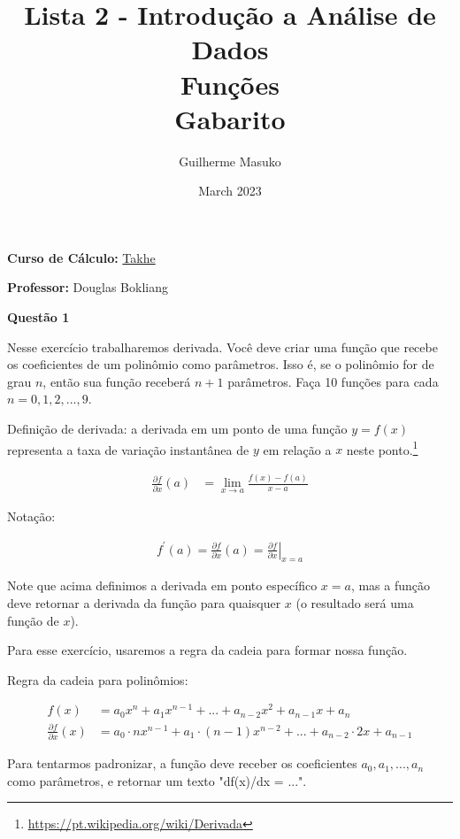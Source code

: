 \documentclass[12pt, a4paper]{article}
\title{Lista 2 - Introdução a Análise de Dados \\
Funções \\
Gabarito}
\author{Guilherme Masuko}
\date{March 2023}
\begin{document}
	
\clearpage
\maketitle
\thispagestyle{empty}


\textbf{Curso de Cálculo:} \href{https://cursos.takhe.com.br/}{Takhe}

\textbf{Professor:} Douglas Bokliang

\vspace{1cm}


\textbf{Questão 1}

Nesse exercício trabalharemos derivada. Você deve criar uma função que recebe os coeficientes de um polinômio como parâmetros. Isso é, se o polinômio for de grau $n$, então sua função receberá $n+1$ parâmetros. Faça 10 funções para cada $n = 0, 1, 2,..., 9$. 

Definição de derivada: a derivada em um ponto de uma função $y = f(x)$ representa a taxa de variação instantânea de $y$ em relação a $x$ neste ponto.\footnote{\url{https://pt.wikipedia.org/wiki/Derivada}}

\begin{align*}
	\frac{\partial f}{\partial x}(a) &= \lim_{x \rightarrow a} \frac{f(x)-f(a)}{x-a}
\end{align*}

Notação:

\begin{align*}
	f^{\prime}(a)=\frac{\partial f}{\partial x}(a)=\left.\frac{\partial f}{\partial x}\right|_{x=a}
\end{align*}

Note que acima definimos a derivada em ponto específico $x=a$, mas a função deve retornar a derivada da função para quaisquer $x$ (o resultado será uma função de $x$).

Para esse exercício, usaremos a regra da cadeia para formar nossa função. 

Regra da cadeia para polinômios:

\begin{align*}
	f(x) &= a_0 x^n + a_{1} x^{n-1} + ... + a_{n-2} x^2 + a_{n-1} x + a_n \\
	\frac{\partial f}{\partial x}(x) &= a_0\cdot n x^{n-1} + a_1\cdot (n-1) x^{n-2} + ... + a_{n-2}\cdot 2 x + a_{n-1}
\end{align*}


Para tentarmos padronizar, a função deve receber os coeficientes $a_0, a_1, ..., a_n$ como parâmetros, e retornar um texto "df(x)/dx = ...".
\end{document}
